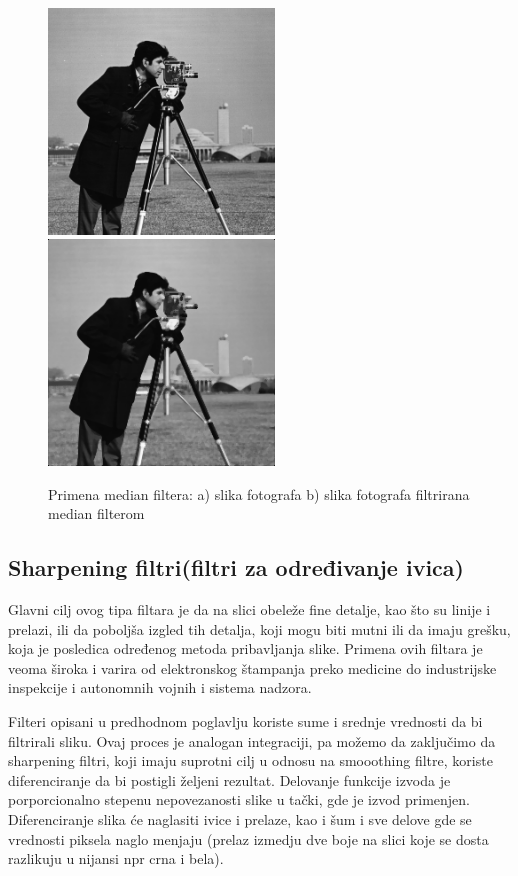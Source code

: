 \documentclass[a4paper,12pt,titlepage]{article}
\begin{document}
\begin{figure}[ht!]
\centering
\includegraphics[width=60mm]{img/img.png}
\includegraphics[width=60mm]{img/imgMed.png}
\caption{Primena median filtera: a) slika fotografa b) slika fotografa filtrirana median filterom}
\label{overflow}
\end{figure}

\subsection{Sharpening filtri(filtri za određivanje ivica)}%

Glavni cilj ovog tipa filtara je da na slici obeleže fine detalje, kao što su linije i prelazi, ili da poboljša izgled tih detalja, koji mogu biti mutni ili da imaju grešku, koja je posledica određenog metoda pribavljanja slike. Primena ovih filtara je veoma široka i varira od elektronskog štampanja preko medicine do industrijske inspekcije i autonomnih vojnih i sistema nadzora. 

Filteri opisani u predhodnom poglavlju koriste sume i srednje vrednosti da bi filtrirali sliku. Ovaj proces je analogan integraciji, pa možemo da zaključimo da sharpening filtri, koji imaju suprotni cilj u odnosu na smooothing filtre, koriste diferenciranje da bi postigli željeni rezultat. Delovanje funkcije izvoda je porporcionalno stepenu nepovezanosti slike u tački, gde je izvod primenjen. Diferenciranje slika će naglasiti ivice i prelaze, kao i šum i sve delove gde se vrednosti piksela naglo menjaju (prelaz izmedju dve boje na slici koje se dosta razlikuju u nijansi npr crna i bela).
\end{document}
